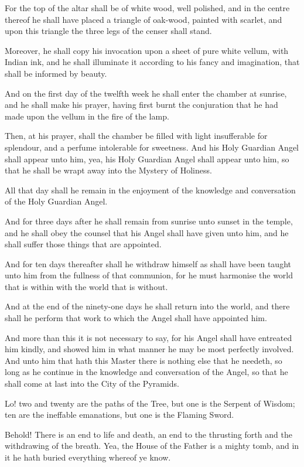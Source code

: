 For the top of the altar shall be of white wood, well polished, and in the centre thereof he shall have placed a triangle of oak-wood, painted with scarlet, and upon this triangle the three legs of the censer shall stand.

Moreover, he shall copy his invocation upon a sheet of pure white vellum, with Indian ink, and he shall illuminate it according to his fancy and imagination, that shall be informed by beauty.

And on the first day of the twelfth week he shall enter the chamber at sunrise, and he shall make his prayer, having first burnt the conjuration that he had made upon the vellum in the fire of the lamp.

Then, at his prayer, shall the chamber be filled with light insufferable for splendour, and a perfume intolerable for sweetness. And his Holy Guardian Angel shall appear unto him, yea, his Holy Guardian Angel shall appear unto him, so that he shall be wrapt away into the Mystery of Holiness.

All that day shall he remain in the enjoyment of the knowledge and conversation of the Holy Guardian Angel.

And for three days after he shall remain from sunrise unto sunset in the temple, and he shall obey the counsel that his Angel shall have given unto him, and he shall suffer those things that are appointed.

And for ten days thereafter shall he withdraw himself as shall have been taught unto him from the fullness of that communion, for he must harmonise the world that is within with the world that is without.

And at the end of the ninety-one days he shall return into the world, and there shall he perform that work to which the Angel shall have appointed him.

And more than this it is not necessary to say, for his Angel shall have entreated him kindly, and showed him in what manner he may be most perfectly involved. And unto him that hath this Master there is nothing else that he needeth, so long as he continue in the knowledge and conversation of the Angel, so that he shall come at last into the City of the Pyramids.




Lo! two and twenty are the paths of the Tree, but one is the Serpent of Wisdom; ten are the ineffable emanations, but one is the Flaming Sword. 

Behold! There is an end to life and death, an end to the thrusting forth and the withdrawing of the breath. Yea, the House of the Father is a mighty tomb, and in it he hath buried everything whereof ye know. 

